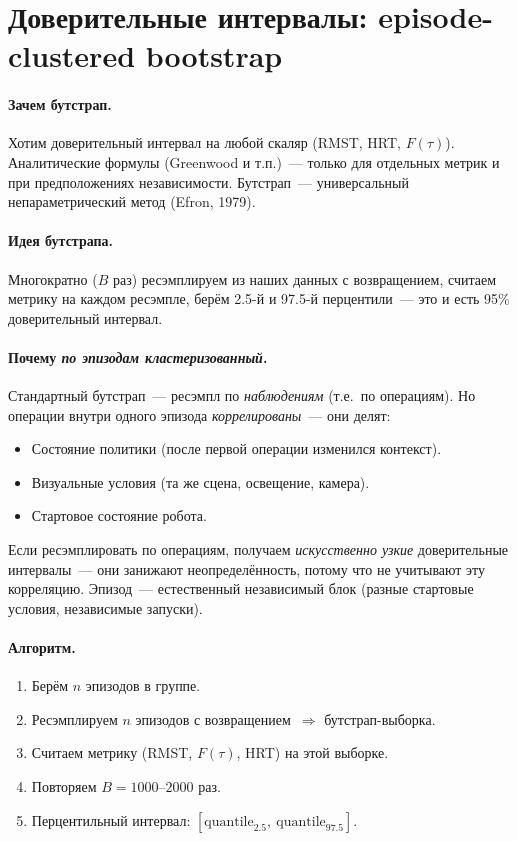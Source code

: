 \documentclass[11pt]{article}
\begin{document}
\section{Доверительные интервалы: episode-clustered bootstrap}

\paragraph{Зачем бутстрап.} Хотим доверительный интервал на любой скаляр (RMST, HRT, $F(\tau)$). Аналитические формулы (Greenwood и т.п.)~--- только для отдельных метрик и при предположениях независимости. Бутстрап~--- универсальный непараметрический метод (Efron, 1979).

\paragraph{Идея бутстрапа.} Многократно ($B$ раз) ресэмплируем из наших данных с возвращением, считаем метрику на каждом ресэмпле, берём 2.5-й и 97.5-й перцентили~--- это и есть 95\% доверительный интервал.

\paragraph{Почему \emph{по эпизодам кластеризованный}.} Стандартный бутстрап~--- ресэмпл по \emph{наблюдениям} (т.е.\ по операциям). Но операции внутри одного эпизода \emph{коррелированы}~--- они делят:
\begin{itemize}[leftmargin=2em, itemsep=1pt]
\item Состояние политики (после первой операции изменился контекст).
\item Визуальные условия (та же сцена, освещение, камера).
\item Стартовое состояние робота.
\end{itemize}
Если ресэмплировать по операциям, получаем \emph{искусственно узкие} доверительные интервалы~--- они занижают неопределённость, потому что не учитывают эту корреляцию. Эпизод~--- естественный независимый блок (разные стартовые условия, независимые запуски).

\paragraph{Алгоритм.}
\begin{enumerate}[leftmargin=2em, itemsep=1pt]
\item Берём $n$ эпизодов в группе.
\item Ресэмплируем $n$ эпизодов с возвращением~$\Rightarrow$ бутстрап-выборка.
\item Считаем метрику (RMST, $F(\tau)$, HRT) на этой выборке.
\item Повторяем $B = 1000$--$2000$ раз.
\item Перцентильный интервал: $[\text{quantile}_{2.5},\ \text{quantile}_{97.5}]$.
\end{enumerate}
\end{document}
